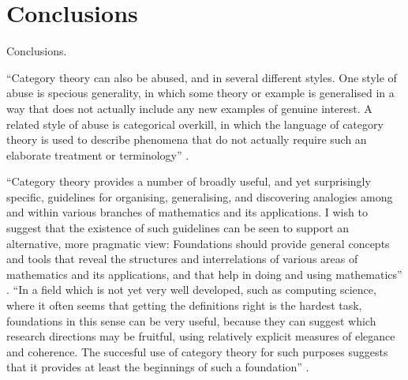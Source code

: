 \chapter{Conclusions}
\label{chap:conclusions}

\begin{epigraphs}
\end{epigraphs}

Conclusions.





``Category theory can also be abused, and in several different styles.
One style of abuse is specious generality, in which some theory or
example is generalised in a way that does not actually include any new
examples of genuine interest. A related style of abuse is categorical
overkill, in which the language of category theory is used to describe
phenomena that do not actually require such an elaborate treatment or
terminology'' \parencite[50]{goguen-1991}.

``Category theory provides a number of broadly useful, and yet
surprisingly specific, guidelines for organising, generalising, and
discovering analogies among and within various branches of mathematics
and its applications. I wish to suggest that the existence of such
guidelines can be seen to support an alternative, more pragmatic view:
Foundations should provide general concepts and tools that reveal the
structures and interrelations of various areas of mathematics and its
applications, and that help in doing and using mathematics''
\parencite[64]{goguen-1991}. ``In a field which is not yet very well
developed, such as computing science, where it often seems that
getting the definitions right is the hardest task, foundations in this
sense can be very useful, because they can suggest which research
directions may be fruitful, using relatively explicit measures of
elegance and coherence. The succesful use of category theory for such
purposes suggests that it provides at least the beginnings of such a
foundation'' \parencite[64]{goguen-1991}.

